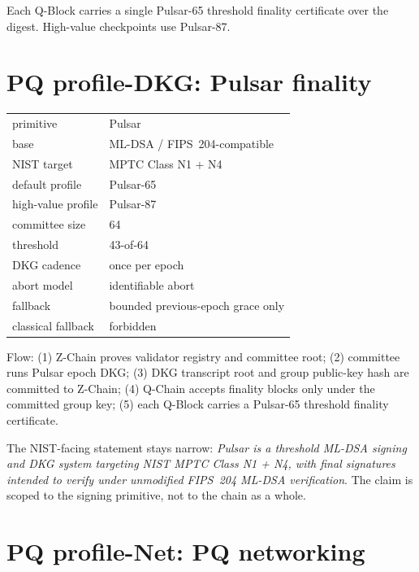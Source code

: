 \documentclass[11pt,a4paper]{article}
\begin{document}
Each Q-Block carries a single Pulsar-65 threshold finality
certificate over the digest. High-value checkpoints use Pulsar-87.

\section{PQ profile-DKG: Pulsar finality}
\label{sec:pq-dkg}

\begin{center}\small
\begin{tabular}{l l}
\toprule
primitive & Pulsar \\
base & ML-DSA / FIPS~204-compatible \\
NIST target & MPTC Class N1 + N4 \\
default profile & Pulsar-65 \\
high-value profile & Pulsar-87 \\
committee size & 64 \\
threshold & 43-of-64 \\
DKG cadence & once per epoch \\
abort model & identifiable abort \\
fallback & bounded previous-epoch grace only \\
classical fallback & forbidden \\
\bottomrule
\end{tabular}
\end{center}

\noindent
Flow: (1) Z-Chain proves validator registry and committee root;
(2) committee runs Pulsar epoch DKG; (3) DKG transcript root and
group public-key hash are committed to Z-Chain; (4) Q-Chain
accepts finality blocks only under the committed group key; (5)
each Q-Block carries a Pulsar-65 threshold finality certificate.

The NIST-facing statement stays narrow: \emph{Pulsar is a threshold
ML-DSA signing and DKG system targeting NIST MPTC Class N1 + N4,
with final signatures intended to verify under unmodified FIPS~204
ML-DSA verification}. The claim is scoped to the signing primitive,
not to the chain as a whole.

\section{PQ profile-Net: PQ networking}
\label{sec:pq-net}
\end{document}
